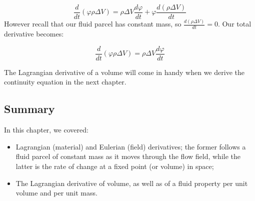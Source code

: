 \documentclass[12pt]{article}
\numberwithin{equation}{section}
\numberwithin{figure}{section}
\numberwithin{table}{section}
\begin{document}
\begin{equation}
  \frac{d}{dt} (\varphi \rho \Delta V) = \rho \Delta V \frac{d\varphi}{dt} + \varphi \frac{d(\rho \Delta V)}{dt}
\end{equation}
However recall that our fluid parcel has constant mass, so $\frac{d(\rho \Delta V)}{dt} = 0$.
Our total derivative becomes:

\begin{equation}
  \frac{d}{dt} (\varphi \rho \Delta V) = \rho \Delta V \frac{d\varphi}{dt}
\end{equation}

The Lagrangian derivative of a volume will come in handy when we derive the
continuity equation in the next chapter.







\subsection{Summary}

In this chapter, we covered:

\begin{itemize}
  \item Lagrangian (material) and Eulerian (field) derivatives;
  the former follows a fluid parcel of constant mass as it moves through
  the flow field, while the latter is the rate of change at a fixed point
  (or volume) in space;
  \item The Lagrangian derivative of volume, as well as of a fluid property per
  unit volume and per unit mass.
\end{itemize}
\end{document}
